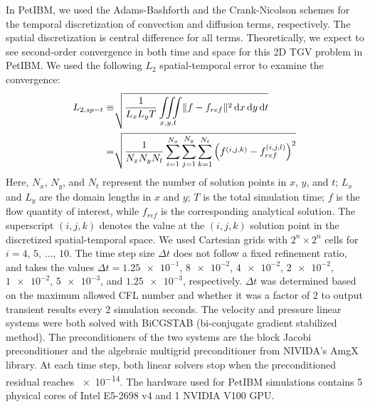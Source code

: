 In PetIBM, we used the Adams-Bashforth and the Crank-Nicolson schemes for the temporal discretization of convection and diffusion terms, respectively.
The spatial discretization is central difference for all terms.
Theoretically, we expect to see second-order convergence in both time and space for this 2D TGV problem in PetIBM.
We used the following $L_2$ spatial-temporal error to examine the convergence:
\begin{equation}\label{eq:spt-err-def}
    \begin{aligned}
    L_{2,sp-t} \equiv &\sqrt{
        \frac{1}{L_x L_y T}
        \iiint\limits_{x, y, t} \lVert f - f_{ref} \rVert^2 \mathop{}\!\mathrm{d} x \mathop{}\!\mathrm{d} y \mathop{}\!\mathrm{d} t
    } \\
    = &
    \sqrt{\frac{1}{N_x N_y N_t}\sum\limits_{i=1}^{N_x}\sum\limits_{j=1}^{N_y}\sum\limits_{k=1}^{N_t}\left(f^{(i, j, k)} - f_{ref}^{(i, j, l)}\right)^2}
    \end{aligned}
\end{equation}
Here, $N_x$, $N_y$, and $N_t$ represent the number of solution points in $x$, $y$, and $t$;
$L_x$ and $L_y$ are the domain lengths in $x$ and $y$;
$T$ is the total simulation time;
$f$ is the flow quantity of interest, while $f_{ref}$ is the corresponding analytical solution.
The superscript $(i, j, k)$ denotes the value at the $(i, j, k)$ solution point in the discretized spatial-temporal space.
We used Cartesian grids with $2^{n} \times 2^{n}$ cells for $i=4$, $5$, $\dots$, $10$.
The time step size $\Delta t$ does not follow a fixed refinement ratio, and takes the values $\Delta t = \num{1.25e-1}$, $\num{8e-2}$, $\num{4e-2}$, $\num{2e-2}$, $\num{1e-2}$, $\num{5e-3}$, and $\num{1.25e-3}$, respectively.
$\Delta t$ was determined based on the maximum allowed CFL number and whether it was a factor of $2$ to output transient results every $\num{2}$ simulation seconds.
The velocity and pressure linear systems were both solved with BiCGSTAB (bi-conjugate gradient stabilized method).
The preconditioners of the two systems are the block Jacobi preconditioner and the algebraic multigrid preconditioner from NIVIDA's AmgX library.
At each time step, both linear solvers stop when the preconditioned residual reaches \num{e-14}.
The hardware used for PetIBM simulations contains 5 physical cores of Intel E5-2698 v4 and 1 NVIDIA V100 GPU.

